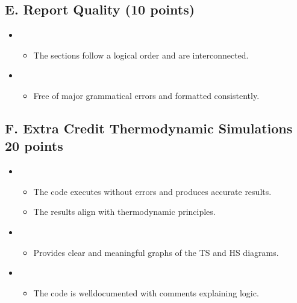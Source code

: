 \documentclass[letterpaper,10pt,english]{jupyterBook}
\begin{document}
\subsection{E. Report Quality (10 points)}
\label{\detokenize{ProjectSyllabus:e-report-quality-10-points}}\begin{itemize}
\item {} 
\sphinxAtStartPar
{}
\begin{itemize}
\item {} 
\sphinxAtStartPar
The sections follow a logical order and are interconnected.

\end{itemize}

\item {} 
\sphinxAtStartPar
{}
\begin{itemize}
\item {} 
\sphinxAtStartPar
Free of major grammatical errors and formatted consistently.

\end{itemize}

\end{itemize}


\subsection{F. Extra Credit \sphinxhyphen{} Thermodynamic Simulations \sphinxhyphen{} 20 points}
\label{\detokenize{ProjectSyllabus:f-extra-credit-thermodynamic-simulations-20-points}}\begin{itemize}
\item {} 
\sphinxAtStartPar
{}
\begin{itemize}
\item {} 
\sphinxAtStartPar
The code executes without errors and produces accurate results.

\item {} 
\sphinxAtStartPar
The results align with thermodynamic principles.

\end{itemize}

\item {} 
\sphinxAtStartPar
{}
\begin{itemize}
\item {} 
\sphinxAtStartPar
Provides clear and meaningful graphs of the T\sphinxhyphen{}S and H\sphinxhyphen{}S diagrams.

\end{itemize}

\item {} 
\sphinxAtStartPar
{}
\begin{itemize}
\item {} 
\sphinxAtStartPar
The code is well\sphinxhyphen{}documented with comments explaining logic.

\end{itemize}

\end{itemize}
\end{document}
